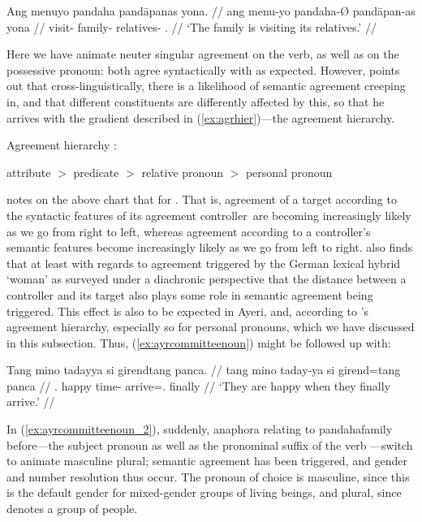 \ex\label{ex:ayrcommitteenoun}\begingl
	\gla Ang menuyo pandaha pandāpanas yona. //
	\glb ang menu-yo pandaha-Ø pandāpan-as yona //
	\glc \AgtT{} visit-\TsgN{} family-\Top{} relatives-\Parg{} 
		\TsgN{}.\Gen{} //
	\glft `The family is visiting its relatives.' //
\endgl\xe

Here we have animate neuter singular agreement on the verb, as well as on the
possessive pronoun: both agree syntactically with 
as expected. However, \citet{corbett2006} points out that cross-linguistically,
there is a likelihood of semantic agreement creeping in, and that different
constituents are differently affected by this, so that he arrives with the
gradient described in (\ref{ex:agrhier})---the agreement hierarchy.

\ex\label{ex:agrhier}%
	Agreement hierarchy \citep[206\psqq]{corbett2006}:\medskip

	attribute $>$ predicate $>$ relative pronoun $>$ personal pronoun
\xe

\citet{corbett2006} notes on the above chart that for . That is, agreement of a target according to the
syntactic features of its agreement controller are becoming increasingly likely
as we go from right to left, whereas agreement according to a controller's
semantic features become increasingly likely as we go from left to right.
\citet{fleischer2012} also finds that at least with regards to agreement
triggered by the German lexical hybrid  `woman' as surveyed under a
diachronic perspective that the distance between a controller and its target
also plays some role in semantic agreement being triggered. This effect is also
to be expected in Ayeri, and, according to \citet{corbett2006}'s agreement
hierarchy, especially so for personal pronouns, which we have discussed in this
subsection. Thus, (\ref{ex:ayrcommitteenoun}) might be followed up with:

\ex\label{ex:ayrcommitteenoun_2}\begingl
	\gla Tang mino tadayya si girendtang panca. //
	\glb tang mino taday-ya si girend=tang panca //
	\glc \TplM{}.\Aarg{} happy time-\Loc{} \Rel{} arrive=\TplM{}.\Aarg{} 
		finally //
	\glft `They are happy when they finally arrive.' //
\endgl\xe

In (\ref{ex:ayrcommitteenoun_2}), suddenly, anaphora relating to 
{pandaha}{family} before---the subject pronoun  as well
as the pronominal suffix of the verb ---switch to animate masculine plural; semantic agreement has been
triggered, and gender and number resolution thus occur. The pronoun of choice
is masculine, since this is the default gender for mixed-gender groups of
living beings, and plural, since  denotes a group of
people.

